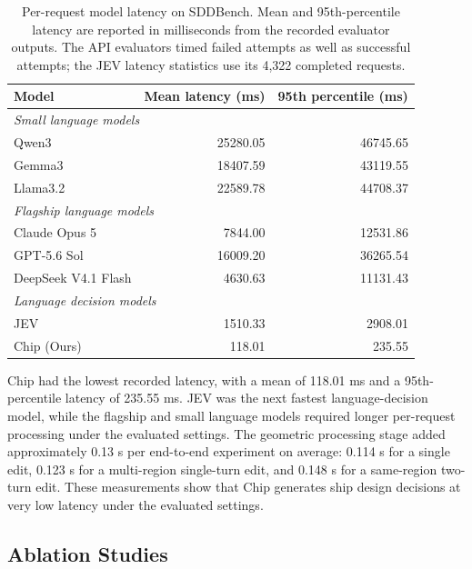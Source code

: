 \documentclass[a4paper,fleqn]{cas-dc}
\begin{document}
\begin{table}[t]
\caption{Per-request model latency on SDDBench. Mean and
95th-percentile latency are reported in milliseconds from the recorded evaluator
outputs. The API evaluators timed failed attempts as well as successful attempts;
the JEV latency statistics use its 4,322 completed requests.}
\label{tab:latency-results}
\centering
\begin{tabular*}{\tblwidth}{@{\extracolsep{\fill}}lrr@{}}
\toprule
Model & Mean latency (ms) & 95th percentile (ms) \\
\midrule
\multicolumn{3}{l}{\textit{Small language models}} \\
Qwen3                & 25280.05 & 46745.65 \\
Gemma3               & 18407.59 & 43119.55 \\
Llama3.2             & 22589.78 & 44708.37 \\
\hline
\multicolumn{3}{l}{\textit{Flagship language models}} \\
Claude Opus 5        & 7844.00  & 12531.86 \\
GPT-5.6 Sol          & 16009.20 & 36265.54 \\
DeepSeek V4.1 Flash  & 4630.63  & 11131.43 \\
\hline
\multicolumn{3}{l}{\textit{Language decision models}} \\
JEV                  & 1510.33  & 2908.01 \\
Chip (Ours)      & 118.01   & 235.55 \\
\bottomrule
\end{tabular*}
\end{table}

Chip had the lowest recorded latency, with a mean of
118.01 ms and a 95th-percentile latency of 235.55 ms. JEV was the next fastest
language-decision model, while the flagship and small language models required
longer per-request processing under the evaluated settings. The geometric
processing stage added approximately 0.13 s per end-to-end experiment on
average: 0.114 s for a single edit, 0.123 s for a multi-region single-turn edit,
and 0.148 s for a same-region two-turn edit. These measurements show that Chip
generates ship design decisions at very low latency under the evaluated settings.

\subsection{Ablation Studies}
\label{sec:ablations}
\end{document}
